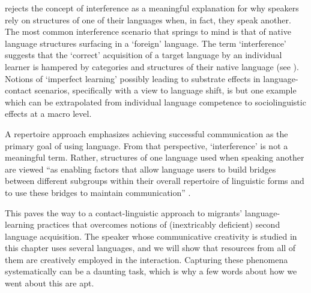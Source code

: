 \documentclass[output=paper]{langscibook}
\begin{document}
\citet[76ff]{matras_language_2020} rejects the concept of interference as a meaningful explanation for why speakers rely on structures of one of their languages when, in fact, they speak another. The most common interference scenario that springs to mind is that of native language structures surfacing in a ‘foreign’ language. The term ‘interference’ suggests that the ‘correct’ acquisition of a target language by an individual learner is hampered by categories and structures of their native language (see \citealt{weinreich_languages_1953}). Notions of ‘imperfect learning’ possibly leading to substrate effects in language-contact scenarios, specifically with a view to language shift, is but one example which can be extrapolated from individual language competence to sociolinguistic effects at a macro level.

A repertoire approach emphasizes achieving successful communication as the primary goal of using language. From that perspective, ‘interference’ is not a meaningful term. Rather, structures of one language used when speaking another are viewed “as enabling factors that allow language users to build bridges between different subgroups within their overall repertoire of linguistic forms and to use these bridges to maintain communication” \citep[78]{matras_language_2020}. 

This paves the way to a contact-linguistic approach to migrants’ language-learning practices that overcomes notions of (inextricably deficient) second language acquisition. The speaker whose communicative creativity is studied in this chapter uses several languages, and we will show that resources from all of them are creatively employed in the interaction. Capturing these phenomena systematically can be a daunting task, which is why a few words about how we went about this are apt.
\end{document}

